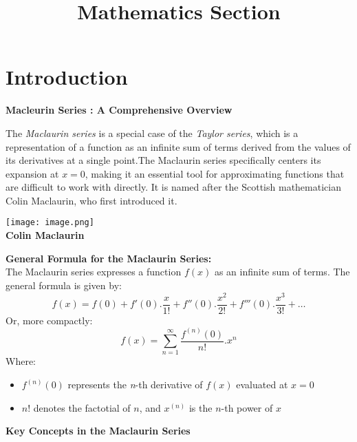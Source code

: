 \documentclass[11pt,a4paper]{article}
\title{\textbf{Mathematics Section}}
\author{}
\date{}
\begin{document}
\maketitle
\section{{Introduction}}
\begin{Large}
    \begin{center}
        \textbf{Macleurin Series : A Comprehensive Overview}
    \end{center}
\end{Large}
\begin{large}
    

\begin{flushleft}
The \textit{Maclaurin series} is a special case of the \textit{Taylor series}, which is a representation of a function as an infinite sum of terms derived from the values of its derivatives at a single point.The Maclaurin series specifically centers its expansion at $x=0$,
 making it an essential tool for approximating functions that are difficult to work with directly. It is named after the Scottish mathematician Colin Maclaurin, who first introduced it.
\end{flushleft}
\begin{center}
\texttt{[image: image.png]}\\
\textbf{Colin Maclaurin}
\end{center}
\end{large}
\textbf{General Formula for the Maclaurin Series:}\\
The Maclaurin series expresses a function $
f(x)$ as an infinite sum of terms. The general formula is given by:$$f(x)=f(0)+f'(0).\frac{x}{1!}+f''(0).\frac{x^2}{2!}+f'''(0).\frac{x^3}{3!}+\dots$$
Or, more compactly:
$$f(x)=\sum_{n=1}^{\infty}
\frac{f^{(n)}(0)}{n!}.x^n$$
Where:
\begin{itemize}
    \item $f^{(n)}(0)$ represents the \textit{n}-th derivative of $f(x)$ evaluated at $x=0$
    \item $n!$ denotes the factotial of $n$, and $x^{(n)}$ is the $n$-th power of $x$
\end{itemize}
\textbf{Key Concepts in the Maclaurin Series}
\end{document}
